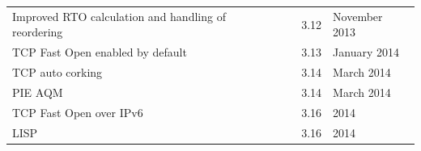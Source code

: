\documentclass{beamer}
\begin{document}
\begin{frame}
\begin{tabu}{X[1.4]X[0.4]X[0.4]X[0.7]}
		Improved RTO calculation and handling of reordering & & 3.12 & November 2013 \\ %
		TCP Fast Open enabled by default & & 3.13 & January 2014 \\
		TCP auto corking & & 3.14 & March 2014 \\ %
		PIE AQM & & 3.14 & March 2014 \\ %
		TCP Fast Open over IPv6 & & 3.16 & 2014 \\
		LISP & \cite{rfc6830} & 3.16 & 2014 \\
		\bottomrule
		\end{tabu}
\end{frame}
\end{document}
